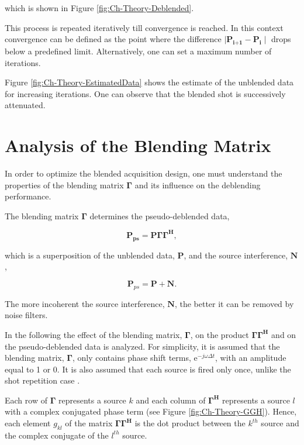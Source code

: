 which is shown in Figure \ref{fig:Ch-Theory-Deblended}.

This process is repeated iteratively till convergence is reached. In this context convergence can be defined as the point where the difference $\mid \textbf{\^P}_\textbf{i+1} - \textbf{\^{P}}_\textbf{i} \mid$ drops below a predefined limit. Alternatively, one can set a maximum number of iterations. 

Figure \ref{fig:Ch-Theory-EstimatedData} shows the estimate of the unblended data for increasing iterations. One can observe that the blended shot is successively  attenuated.



\section{Analysis of the Blending Matrix} \label{sec:BlendingMatrix}

In order to optimize the blended acquisition design, one must understand the properties of the blending matrix $\mathbf{\Gamma}$ and its influence on the deblending performance.

The blending matrix $\mathbf{\Gamma}$ determines the pseudo-deblended data,

\begin{equation}
	\mathbf{ P_{ps} } = \mathbf{P \Gamma \Gamma ^H},
	\label{eq:Ch-Theory-Pseudo-Deblended-Data}
\end{equation}

which is a superposition of the unblended data, $\mathbf{P}$, and the source interference, $\mathbf{N}$,

\begin{equation}
	\mathbf{P}_{ps} = \mathbf{P} + \mathbf{N}.
	\label{eq:Ch-Theory-PseudoSuperposition}
\end{equation}

The more incoherent the source interference, $\mathbf{N}$, the better it can be removed by noise filters.

In the following the effect of the blending matrix, $\mathbf{\Gamma}$, on the product $\mathbf{\Gamma \Gamma^H}$ and on the pseudo-deblended data is analyzed. For simplicity, it is assumed that the blending matrix, $\mathbf{\Gamma}$, only contains phase shift terms, $\mathrm{e}^{-j \omega \Delta t}$, with an amplitude equal to 1 or 0. It is also assumed that each source is fired only once, unlike the shot repetition case \citep{Sixue}.

Each row of $\mathbf{\Gamma}$ represents a source $k$ and each column of $\mathbf{\Gamma ^H}$ represents a source $l$ with a complex conjugated phase term (see Figure \ref{fig:Ch-Theory-GGH}). Hence, each element $g_{kl}$ of the matrix $\mathbf{\Gamma \Gamma^H}$ is the dot product between the $k^{th}$ source and the complex conjugate of the $l^{th}$ source.


